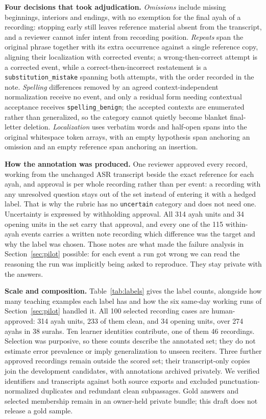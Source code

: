 \documentclass{article}
\begin{document}
\textbf{Four decisions that took adjudication.} \emph{Omissions} include missing beginnings, interiors and endings, with no exemption for the final ayah of a recording: stopping early still leaves reference material absent from the transcript, and a reviewer cannot infer intent from recording position. \emph{Repeats} span the original phrase together with its extra occurrence against a single reference copy, aligning their localization with corrected events; a wrong-then-correct attempt is a corrected event, while a correct-then-incorrect restatement is a \texttt{substitution\_mistake} spanning both attempts, with the order recorded in the note. \emph{Spelling} differences removed by an agreed context-independent normalization receive no event, and only a residual form needing contextual acceptance receives \texttt{spelling\_benign}; the accepted contexts are enumerated rather than generalized, so the category cannot quietly become blanket final-letter deletion. \emph{Localization} uses verbatim words and half-open spans into the original whitespace token arrays, with an empty hypothesis span anchoring an omission and an empty reference span anchoring an insertion.

\textbf{How the annotation was produced.} One reviewer approved every record, working from the unchanged ASR transcript beside the exact reference for each ayah, and approval is per whole recording rather than per event: a recording with any unresolved question stays out of the set instead of entering it with a hedged label. That is why the rubric has no \texttt{uncertain} category and does not need one. Uncertainty is expressed by withholding approval. All 314 ayah units and 34 opening units in the set carry that approval, and every one of the 115 within-ayah events carries a written note recording which difference was the target and why the label was chosen. Those notes are what made the failure analysis in Section~\ref{sec:pilot} possible: for each event a run got wrong we can read the reasoning the run was implicitly being asked to reproduce. They stay private with the answers.

\textbf{Scale and composition.} Table~\ref{tab:labels} gives the label counts, alongside how many teaching examples each label has and how the six same-day working runs of Section~\ref{sec:pilot} handled it. All 100 selected recording cases are human-approved: 314 ayah units, 233 of them clean, and 34 opening units, over 274 ayahs in 38 surahs. Ten learner identities contribute, one of them 46 recordings. Selection was purposive, so these counts describe the annotated set; they do not estimate error prevalence or imply generalization to unseen reciters. Three further approved recordings remain outside the scored set; their transcript-only copies join the development candidates, with annotations archived privately. We verified identifiers and transcripts against both source exports and excluded punctuation-normalized duplicates and redundant clean subpassages. Gold answers and selected membership remain in an owner-held private bundle; this draft does not release a gold sample.
\end{document}
